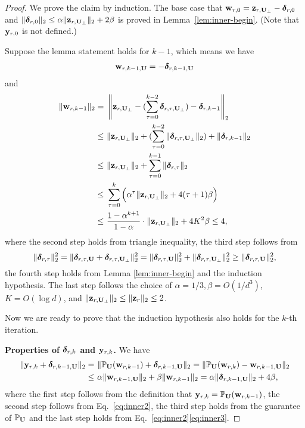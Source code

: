 \begin{proof}
We prove the claim by induction. The base case that $\mathbf{w}_{r, 0} = \mathbf{z}_{r, \mathbf{U}_\perp} - \boldsymbol\delta_{r, 0}$ and $\|\boldsymbol\delta_{r, 0}\|_{2} \leq \alpha \|\mathbf{z}_{r, \mathbf{U}_{\perp}}\|_2 + 2\beta$ is proved in Lemma~\ref{lem:inner-begin}. (Note that $\mathbf{y}_{r, 0}$ is not defined.)

Suppose the lemma statement holds for $k-1$, which means we have
\begin{align}
\mathbf{w}_{r, k-1, \mathbf{U}} = -\boldsymbol\delta_{r, k - 1, \mathbf{U}} \label{eq:inner2}
\end{align}
and
\begin{align}
\|\mathbf{w}_{r, k-1}\|_2 = &~ \left\|\mathbf{z}_{r, \mathbf{U}_{\perp}} - (\sum_{\tau=0}^{k-2} \boldsymbol\delta_{r, \tau, \mathbf{U}_{\perp}}) - \boldsymbol\delta_{r, k-1} \right\|_2 \notag \\
\leq &~ \|\mathbf{z}_{r, \mathbf{U}_{\perp}}\|_2 + (\sum_{\tau=0}^{k-2} \|\boldsymbol\delta_{r, \tau, \mathbf{U}_{\perp}}\|_2) + \|\boldsymbol\delta_{r, k-1}\|_2 \notag \\
\leq &~ \|\mathbf{z}_{r, \mathbf{U}_{\perp}}\|_2 + \sum_{\tau=0}^{k-1} \|\boldsymbol\delta_{r, \tau}\|_2  \notag\\
\leq &~ \sum_{\tau=0}^{k} \Big( \alpha^{\tau}\|\mathbf{z}_{r, \mathbf{U}_{\perp}}\|_2 + 4(\tau+1)\beta \Big) \notag \\
\leq &~ \frac{1-\alpha^{k+1}}{1-\alpha} \cdot \|\mathbf{z}_{r, \mathbf{U}_{\perp}}\|_2 + 4K^2\beta \leq 4, \label{eq:inner3}
\end{align}
where the second step holds from triangle inequality, the third step follows from 
\[
\|\boldsymbol\delta_{r, \tau}\|_2^2 = \|\boldsymbol\delta_{r, \tau, \mathbf{U}} + \boldsymbol\delta_{r, \tau, \mathbf{U}_\perp}\|_2^2 = \|\boldsymbol\delta_{r, \tau, \mathbf{U}}\|_2^2 + \|\boldsymbol\delta_{r, \tau, \mathbf{U}_\perp}\|_2^2 \geq \|\boldsymbol\delta_{r, \tau, \mathbf{U}}\|_2^2,
\]
the fourth step holds from Lemma \ref{lem:inner-begin} and the induction hypothesis.
The last step follows the choice of $\alpha = 1/3, \beta = O(1/d^3)$, $K = O(\log d)$, and $\|\mathbf{z}_{r, \mathbf{U}_\perp}\|_2 \leq \|\mathbf{z}_{r}\|_2 \leq 2$.

Now we are ready to prove that the induction hypothesis also holds for the $k$-th iteration.

{\bf Properties of $\boldsymbol\delta_{r,k}$ and $\mathbf{y}_{r,k}$.}
We have
\begin{align}
\|\mathbf{y}_{r, k} + \boldsymbol\delta_{r, k-1, \mathbf{U}}\|_2 = &~ \|\mathbb{P}_{\mathbf{U}}(\mathbf{w}_{r, k-1}) + \boldsymbol\delta_{r, k-1, \mathbf{U}}\|_2 = \|\mathbb{P}_{\mathbf{U}}(\mathbf{w}_{r, k}) -  \mathbf{w}_{r, k-1, \mathbf{U}}\|_2\notag \\
\leq &~ \alpha\|\mathbf{w}_{r, k-1, \mathbf{U}}\|_2 + \beta \|\mathbf{w}_{r, k-1}\|_2 = \alpha\|\boldsymbol\delta_{r, k-1, \mathbf{U}}\|_2 + 4\beta, \label{eq:inner4}
\end{align}
where the first step follows from the definition that $\mathbf{y}_{r, k} = \mathbb{P}_{\mathbf{U}}(\mathbf{w}_{r, k-1})$, the second step follows from Eq.~\eqref{eq:inner2}, the third step holds from the guarantee of $\mathbb{P}_{\mathbf{U}}$ and the last step holds from Eq.~\eqref{eq:inner2}\eqref{eq:inner3}. 


\end{proof}

